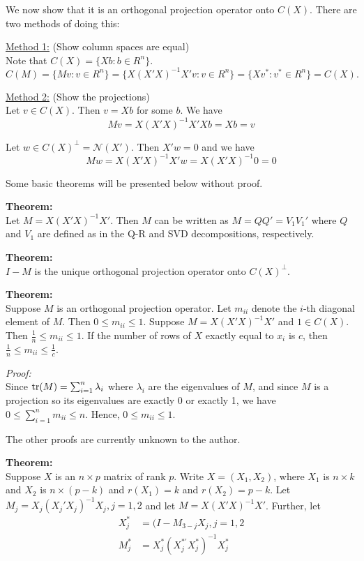 \documentclass[12pt]{article}
\numberwithin{equation}{section}
\begin{document}
We now show that it is an orthogonal projection operator onto $C(X)$. There are two methods of doing this:

\underline{Method 1:} (Show column spaces are equal) \\
Note that $C(X) = \{Xb: b \in R^n \}$. 
\begin{equation*}
  C(M) = \{ Mv : v\in R^n \}
    = \{X(X'X)^{-1} X'v : v \in R^n \}
    = \{Xv^* : v^* \in R^n \}
    = C(X).
\end{equation*}

\underline{Method 2:} (Show the projections) \\
Let $v \in C(X)$. Then $v = Xb$ for some $b$. We have
\begin{equation*}
  Mv = X (X'X)^{-1} X' Xb = Xb = v
\end{equation*}

Let $w \in C(X)^{\perp} = \mathcal{N}(X')$. Then $X'w = 0$ and we have
\begin{equation*}
  Mw = X (X'X)^{-1} X'w = X (X'X)^{-1} 0 = 0
\end{equation*}

Some basic theorems will be presented below without proof.

\textbf{Theorem:} \\
Let $M = X (X'X)^{-1} X'$. Then $M$ can be written as $M = QQ' = V_1 V_1'$ where $Q$ and $V_1$ are defined as in the Q-R and SVD decompositions, respectively.

\textbf{Theorem:} \\
$I-M$ is the unique orthogonal projection operator onto $C(X)^{\perp}$. 

\textbf{Theorem:} \\
Suppose $M$ is an orthogonal projection operator. Let $m_{ii}$ denote the $i$-th diagonal element of $M$. Then $0 \le m_{ii} \le 1$. Suppose $M = X(X'X)^{-1}X'$ and $1 \in C(X)$. Then $\frac{1}{n} \le m_{ii} \le 1$. If the number of rows of $X$ exactly equal to $x_i$ is $c$, then $\frac{1}{n} \le m_{ii} \le \frac{1}{c}$.

\textit{Proof:} \\
Since $\tr(M) = \sum_{i=1}^n \lambda_i$ where $\lambda_i$ are the eigenvalues of $M$, and since $M$ is a projection so its eigenvalues are exactly 0 or exactly 1, we have $0 \le \sum_{i=1}^n m_{ii} \le n$. Hence, $0 \le m_{ii} \le 1$. 

The other proofs are currently unknown to the author.

\textbf{Theorem:}\\
Suppose $X$ is an $n \times p$ matrix of rank $p$. Write $X = (X_1, X_2)$, where $X_1$ is $n \times k$ and $X_2$ is $n \times (p - k)$ and $r(X_1) = k$ and $r(X_2) = p - k$. Let $M_j = X_j (X_j' X_j)^{-1} X_j, j = 1,2$ and let $M = X(X'X)^{-1} X'$. Further, let
\begin{align*}
  X_j^{*} &= (I - M_{3 - j} X_j, j = 1, 2 \\
  M_{j}^{*} &= X_j^{*} (X_j^{*'} X_j^{*})^{-1} X_j^{*}
\end{align*}
\end{document}
